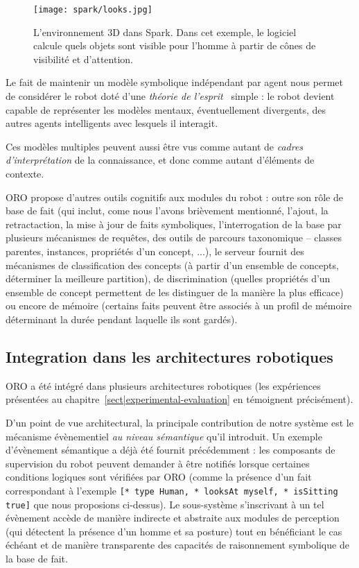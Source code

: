 \begin{figure}
\centering
  \texttt{[image: spark/looks.jpg]}

  \caption{L'environnement 3D dans {\sc Spark}. Dans cet exemple, le logiciel
  calcule quels objets sont visible pour l'homme à partir de cônes de
  visibilité et d'attention.}

  \label{fig|spark}
\end{figure}

Le fait de maintenir un modèle symbolique indépendant par agent nous permet de
considérer le robot doté d'une \emph{théorie de l'esprit}~\cite{Leslie2000}
simple : le robot devient capable de représenter les modèles mentaux,
éventuellement divergents, des autres agents intelligents avec lesquels il
interagit.

Ces modèles multiples peuvent aussi être vus comme autant de \emph{cadres
d'interprétation} de la connaissance, et donc comme autant d'éléments de
contexte.

ORO propose d'autres outils cognitifs aux modules du robot : outre son rôle de
base de fait (qui inclut, come nous l'avons brièvement mentionné, l'ajout, la
retractaction, la mise à jour de faits symboliques, l'interrogation de la base
par plusieurs mécanismes de requêtes, des outils de parcours taxonomique --
classes parentes, instances, propriétés d'un concept, ...), le serveur fournit
des mécanismes de classification des concepts (à partir d'un ensemble de
concepts, déterminer la meilleure partition), de discrimination (quelles
propriétés d'un ensemble de concept permettent de les distinguer de la manière
la plus efficace) ou encore de mémoire (certains faits peuvent être associés à
un profil de mémoire déterminant la durée pendant laquelle ils sont gardés).

\subsection*{Integration dans les architectures robotiques}

ORO a été intégré dans plusieurs architectures robotiques (les expériences
présentées au chapitre~\ref{sect|experimental-evaluation} en témoignent
précisément).

D'un point de vue architectural, la principale contribution de notre système
est le mécanisme évènementiel \emph{au niveau sémantique} qu'il introduit. Un
exemple d'évènement sémantique a déjà été fournit précédemment : les composants
de supervision du robot peuvent demander à être notifiés lorsque certaines
conditions logiques sont vérifiées par ORO (comme la présence d'un fait
correspondant à l'exemple {\tt [* type Human, * looksAt myself, * isSitting
true]} que nous proposions ci-dessus). Le sous-système s'inscrivant à un tel
évènement accède de manière indirecte et abstraite aux modules de perception
(qui détectent la présence d'un homme et sa posture) tout en bénéficiant le cas
échéant et de manière transparente des capacités de raisonnement symbolique de
la base de fait.

